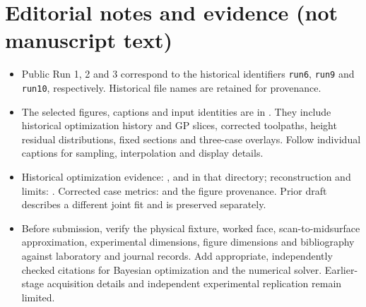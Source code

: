\documentclass[11pt]{article}
\begin{document}
\section*{Editorial notes and evidence (not manuscript text)}
\begin{itemize}
\item Public Run 1, 2 and 3 correspond to the historical identifiers \texttt{run6}, \texttt{run9} and \texttt{run10}, respectively. Historical file names are retained for provenance.
\item The selected figures, captions and input identities are in . They include historical optimization history and GP slices, corrected toolpaths, height residual distributions, fixed sections and three-case overlays. Follow individual captions for sampling, interpolation and display details.
\item Historical optimization evidence: ,  and  in that directory; reconstruction and limits: . Corrected case metrics:  and the figure provenance. Prior draft  describes a different joint fit and is preserved separately.
\item Before submission, verify the physical fixture, worked face, scan-to-midsurface approximation, experimental dimensions, figure dimensions and bibliography against laboratory and journal records. Add appropriate, independently checked citations for Bayesian optimization and the numerical solver. Earlier-stage acquisition details and independent experimental replication remain limited.
\end{itemize}
\end{document}

